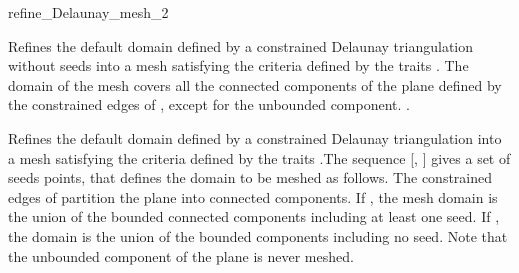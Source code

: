 \begin{ccRefFunction}{refine_Delaunay_mesh_2}


{ Refines the default domain defined by a constrained Delaunay
  triangulation without seeds into a mesh satisfying the criteria
  defined by the traits . The domain of the mesh
  covers all the connected components of the plane defined by the
  constrained edges of , except for the unbounded component.
  .
  }

                     { Refines the default domain defined by a constrained
                       Delaunay triangulation into a mesh
                       satisfying the criteria defined by the traits
                       .The sequence [, ]
                       gives a set of seeds points, that defines the domain
                       to be meshed as follows. The constrained edges of
                        partition the plane into connected components.
                       If , the mesh domain is the union of
                       the bounded connected components including at least
                       one seed. If , the domain is the
                       union of the bounded components including no seed.
                       Note that the unbounded component of the plane is
                       never meshed.
                       }

\end{ccRefFunction}


